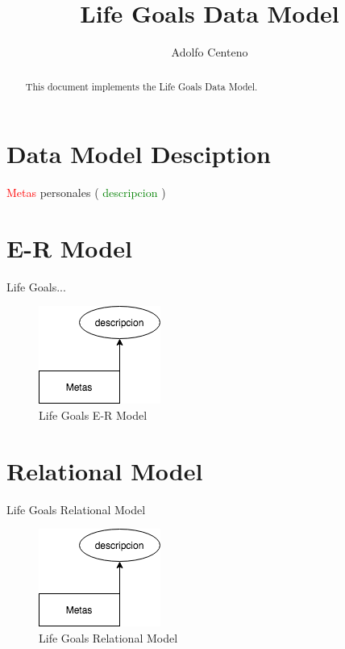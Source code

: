 \documentclass[10pt]{article}         %
\title{Life Goals Data Model}
\author{Adolfo Centeno}
\begin{document}
\maketitle

\begin{abstract}
This document implements the Life Goals Data Model.
\end{abstract}

\section{Data Model Desciption}


\textcolor{red}{Metas} personales ( \textcolor{green}{descripcion} )



\section{E-R Model}

Life Goals...

\begin{figure}[h]
     \includegraphics[scale=0.6]{er_lifegoals}
     \caption{Life Goals E-R Model}
\end{figure}
   
\section{Relational Model}
Life Goals Relational Model

\begin{figure}[h]
     \includegraphics[scale=0.6]{er_lifegoals}
     \caption{Life Goals Relational Model}
\end{figure}
\end{document}
